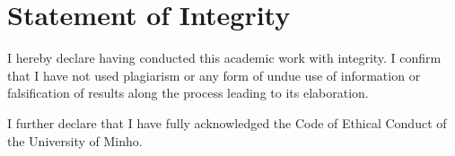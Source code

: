 \chapter*{Statement of Integrity}
\noindent I hereby declare having conducted this academic work with integrity. I confirm that I have not used plagiarism or any form of undue use of information or falsification of results along the process leading to its elaboration.

\noindent I further declare that I have fully acknowledged the Code of Ethical Conduct of the University of Minho.